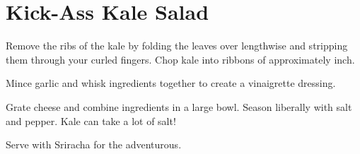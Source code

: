 \section{Kick-Ass Kale Salad}
\begin{recipe}



Remove the ribs of the kale by folding the leaves over lengthwise and stripping them through your curled fingers. Chop kale into ribbons of approximately  inch.


Mince garlic and whisk ingredients together to create a vinaigrette dressing.



Grate cheese and combine ingredients in a large bowl. Season liberally with salt and pepper. Kale can take a lot of salt!

Serve with Sriracha for the adventurous.

\end{recipe}


